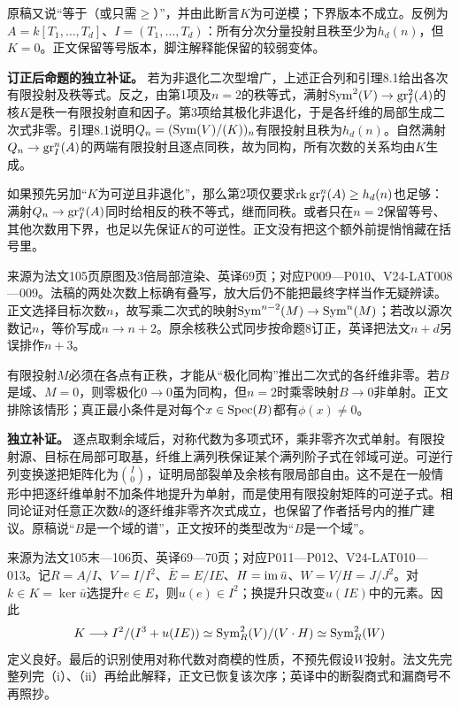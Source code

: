 原稿又说“等于（或只需$\ge$）”，并由此断言$K$为可逆模；下界版本不成立。反例为$A=k[T_1,\ldots,T_d]$、$I=(T_1,\ldots,T_d)$：所有分次分量投射且秩至少为$h_d(n)$，但$K=0$。正文保留等号版本，脚注解释能保留的较弱变体。

\textbf{订正后命题的独立补证。} 若为非退化二次型增广，上述正合列和引理8.1给出各次有限投射及秩等式。反之，由第1项及$n=2$的秩等式，满射$\operatorname{Sym}^2(V)\to\operatorname{gr}_I^2(A)$的核$K$是秩一有限投射直和因子。第3项给其极化非退化，于是各纤维的局部生成二次式非零。引理8.1说明$Q_n=(\operatorname{Sym}(V)/(K))_n$有限投射且秩为$h_d(n)$。自然满射$Q_n\to\operatorname{gr}_I^n(A)$的两端有限投射且逐点同秩，故为同构，所有次数的关系均由$K$生成。

如果预先另加“$K$为可逆且非退化”，那么第2项仅要求$\operatorname{rk}\operatorname{gr}_I^n(A)\ge h_d(n)$也足够：满射$Q_n\to\operatorname{gr}_I^n(A)$同时给相反的秩不等式，继而同秩。或者只在$n=2$保留等号、其他次数用下界，也足以先保证$K$的可逆性。正文没有把这个额外前提悄悄藏在括号里。

来源为法文105页原图及3倍局部渲染、英译69页；对应P009—P010、V24-LAT008—009。法稿的两处次数上标确有叠写，放大后仍不能把最终字样当作无疑辨读。正文选择目标次数$n$，故写乘二次式的映射$\operatorname{Sym}^{n-2}(M)\to\operatorname{Sym}^n(M)$；若改以源次数记$n$，等价写成$n\to n+2$。原余核秩公式同步按命题8订正，英译把法文$n+d$另误排作$n+3$。

有限投射$M$必须在各点有正秩，才能从“极化同构”推出二次式的各纤维非零。若$B$是域、$M=0$，则零极化$0\to0$虽为同构，但$n=2$时乘零映射$B\to0$非单射。正文排除该情形；真正最小条件是对每个$x\in\operatorname{Spec}(B)$都有$\phi(x)\ne0$。

\textbf{独立补证。} 逐点取剩余域后，对称代数为多项式环，乘非零齐次式单射。有限投射源、目标在局部可取基，纤维上满列秩保证某个满列阶子式在邻域可逆。可逆行列变换遂把矩阵化为$\binom{I}{0}$，证明局部裂单及余核有限局部自由。这不是在一般情形中把逐纤维单射不加条件地提升为单射，而是使用有限投射矩阵的可逆子式。相同论证对任意正次数$k$的逐纤维非零齐次式成立，也保留了作者括号内的推广建议。原稿说“$B$是一个域的谱”，正文按环的类型改为“$B$是一个域”。

来源为法文105末—106页、英译69—70页；对应P011—P012、V24-LAT010—013。记$R=A/I$、$V=I/I^2$、$\bar E=E/IE$、$H=\operatorname{im}\bar u$、$W=V/H=J/J^2$。对$k\in K=\ker\bar u$选提升$e\in E$，则$u(e)\in I^2$；换提升只改变$u(IE)$中的元素。因此
\[
K\longrightarrow I^2/(I^3+u(IE))
\simeq\operatorname{Sym}_R^2(V)/(V\cdot H)
\simeq\operatorname{Sym}_R^2(W)
\]
定义良好。最后的识别使用对称代数对商模的性质，不预先假设$W$投射。法文先完整列完（i）、（ii）再给此解释，正文已恢复该次序；英译中的断裂商式和漏商号不再照抄。

